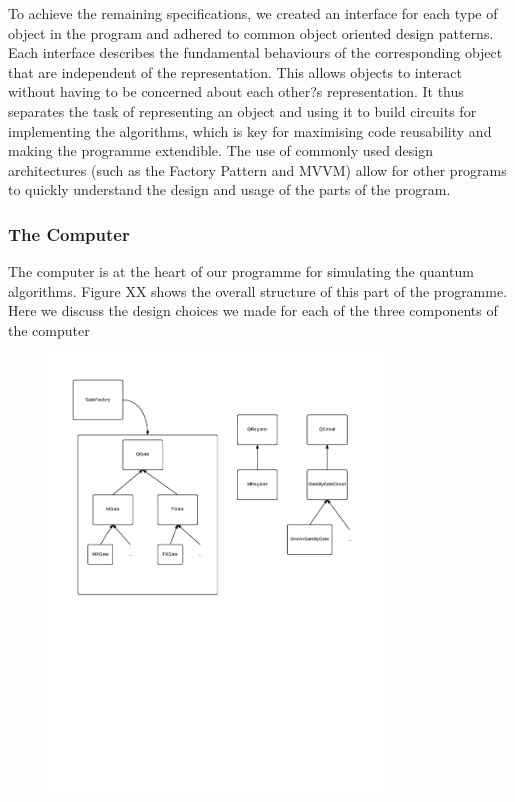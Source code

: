 \documentclass[bibliography=totocnumbered, 10pt]{article}
\theoremstyle{NoticeStyle}
\begin{document}
To achieve the remaining specifications, we created an interface for each type of object in the program and adhered to common object oriented design patterns. Each interface describes the fundamental behaviours of the corresponding object that are independent of the representation. This allows objects to interact without having to be concerned about each other?s representation. It thus separates the task of representing an object and using it to build circuits for implementing the algorithms, which is key for maximising code reusability and making the programme extendible. The use of commonly used design architectures (such as the Factory Pattern and MVVM) allow for other programs to quickly understand the design and usage of the parts of the program. 

\subsubsection{The Computer}\label{sec:The Computer}
The computer is at the heart of our programme for simulating the quantum algorithms. Figure XX shows the overall structure of this part of the programme. Here we discuss the design choices we made for each of the three components of the computer
\newenvironment{myenumerate}{%
  \edef\backupindent{\the\parindent}%
  \enumerate%
  \setlength{\parindent}{\backupindent}%
}{\endenumerate}

\begin{figure}[H]
\centering
\includegraphics[width=0.8\textwidth]{img/QuantumSimDesign.pdf}
\caption{}
\end{figure}
\end{document}
